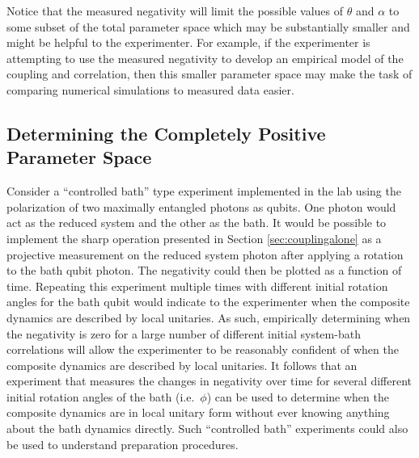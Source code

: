 Notice that the measured negativity will limit the possible values of $\theta$ and $\alpha$ to some subset of the total parameter space which may be substantially smaller and might be helpful to the experimenter.  For example, if the experimenter is attempting to use the measured negativity to develop an empirical model of the coupling and correlation, then this smaller parameter space may make the task of comparing numerical simulations to measured data easier.

\subsection{Determining the Completely Positive Parameter Space}

Consider a ``controlled bath'' type experiment implemented in the lab using the polarization of two maximally entangled photons as qubits.  One photon would act as the reduced system and the other as the bath.  It would be possible to implement the sharp operation presented in Section \ref{sec:couplingalone} as a projective measurement on the reduced system photon after applying a rotation to the bath qubit photon.  The negativity could then be plotted as a function of time.  Repeating this experiment multiple times with different initial rotation angles for the bath qubit would indicate to the experimenter when the composite dynamics are described by local unitaries.  As such, empirically determining when the negativity is zero for a large number of different initial system-bath correlations will allow the experimenter to be reasonably confident of when the composite dynamics are described by local unitaries.  It follows that an experiment that measures the changes in negativity over time for several different initial rotation angles of the bath (i.e.\ $\phi$) can be used to determine when the composite dynamics are in local unitary form without ever knowing anything about the bath dynamics directly.  Such ``controlled bath'' experiments could also be used to understand preparation procedures.
 
